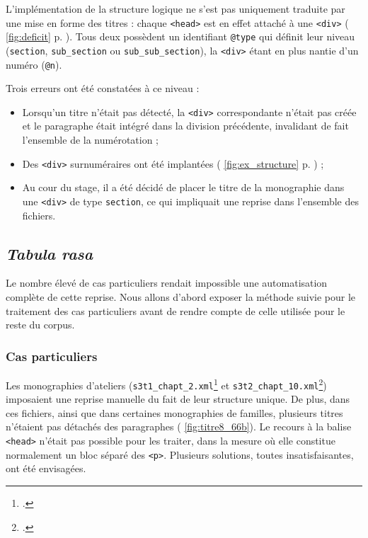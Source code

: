 L'implémentation de la structure logique ne s'est pas uniquement traduite par une mise en forme des titres : chaque \texttt{<head>} est en effet attaché à une \texttt{<div>} (\fig{} \ref{fig:deficit} p. \pageref{fig:deficit}). Tous deux possèdent un identifiant \texttt{@type} qui définit leur niveau (\texttt{section}, \texttt{sub\_section} ou \texttt{sub\_sub\_section}), la \texttt{<div>} étant en plus nantie d'un numéro (\texttt{@n}).

Trois erreurs ont été constatées à ce niveau :

\begin{itemize}
    \item Lorsqu'un titre n'était pas détecté, la \texttt{<div>} correspondante n'était pas créée et le paragraphe était intégré dans la division précédente, invalidant de fait l'ensemble de la numérotation ;
    \item Des \texttt{<div>} surnuméraires ont été implantées (\fig{} \ref{fig:ex_structure} p. \pageref{fig:ex_structure}) ;
    \item Au cour du stage, il a été décidé de placer le titre de la monographie dans une \texttt{<div>} de type \texttt{section}, ce qui impliquait une reprise dans l'ensemble des fichiers.
\end{itemize}

\subsection{\textit{Tabula rasa}}

Le nombre élevé de cas particuliers rendait impossible une automatisation complète de cette reprise. Nous allons d'abord exposer la méthode suivie pour le traitement des cas particuliers avant de rendre compte de celle utilisée pour le reste du corpus.

\subsubsection{Cas particuliers}

Les monographies d'ateliers (\texttt{s3t1\_chapt\_2.xml}\footcite{mono472a} et \texttt{s3t2\_chapt\_10.xml}\footcite{mono473a}) imposaient une reprise manuelle du fait de leur structure unique. De plus, dans ces fichiers, ainsi que dans certaines monographies de familles, plusieurs titres n'étaient pas détachés des paragraphes (\fig{} \ref{fig:titre8_66b}). Le recours à la balise \texttt{<head>} n'était pas possible pour les traiter, dans la mesure où elle constitue normalement un bloc séparé des \texttt{<p>}. Plusieurs solutions, toutes insatisfaisantes, ont été envisagées.

